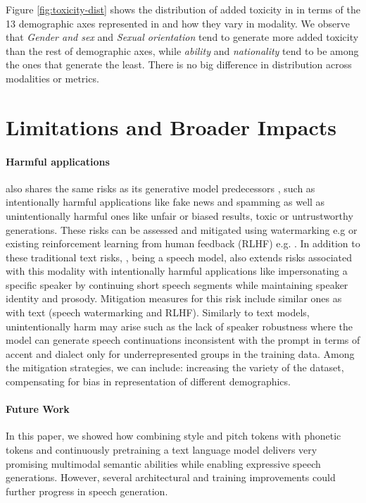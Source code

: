 Figure \ref{fig:toxicity-dist} shows the distribution of added toxicity in \spot in terms of the 13 demographic axes represented in \holisticbias and how they vary in modality. We observe that \textit{Gender and sex} and \textit{Sexual orientation} tend to generate more added toxicity than the rest of demographic axes, while \textit{ability} and \textit{nationality} tend to be among the ones that generate the least. There is no big difference in distribution across modalities or metrics.

\section{Limitations and Broader Impacts}\label{sec:limitsandimpacts}

\paragraph{Harmful applications} \spot also shares the same risks as its generative model predecessors \cite{touvron2023llama}, such as intentionally harmful applications like fake news and spamming as well as unintentionally harmful ones like unfair or biased results, toxic or untrustworthy generations. These risks can be assessed and mitigated using watermarking e.g \cite{kirchenbauer2023watermark} or existing reinforcement learning from human feedback (RLHF) e.g. \cite{bai2022training}.
In addition to these traditional text risks, \spot, being a speech model, also extends risks associated with this modality with intentionally harmful applications like impersonating a specific speaker by continuing short speech segments while maintaining speaker identity and prosody. Mitigation measures for this risk include similar ones as with text (speech watermarking \cite{communication2023seamless} and RLHF). Similarly to text models, unintentionally harm may arise such as the lack of speaker robustness where the model can generate speech continuations inconsistent with the prompt in terms of accent and dialect only for underrepresented groups in the training data. Among the mitigation strategies, we can include: increasing the variety of the dataset, compensating for bias in representation of different demographics.

\paragraph{Future Work} In this paper, we showed how combining style and pitch tokens with phonetic tokens and continuously pretraining a text language model delivers very promising multimodal semantic abilities while enabling expressive speech generations. However, several architectural and training improvements could further progress in speech generation.

